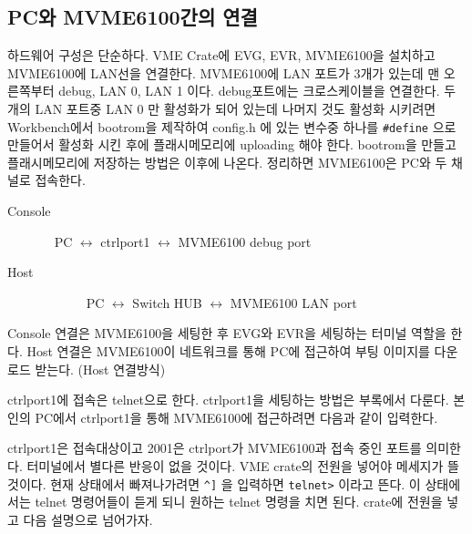 \documentclass[11pt,a4paper]{article}
\begin{document}
\subsection{PC와 MVME6100간의 연결}
하드웨어 구성은 단순하다. VME Crate에 EVG, EVR, MVME6100을 설치하고 MVME6100에 LAN선을 연결한다.
MVME6100에 LAN 포트가 3개가 있는데 맨 오른쪽부터 debug, LAN 0, LAN 1 이다. debug포트에는 크로스케이블을 연결한다.
두개의 LAN 포트중 LAN 0 만 활성화가 되어 있는데 나머지 것도 활성화 시키려면 Workbench에서 bootrom을 제작하여
config.h 에 있는 변수중 하나를 \verb|#define| 으로 만들어서 활성화 시킨 후에 플래시메모리에 uploading 해야 한다.
bootrom을 만들고 플래시메모리에 저장하는 방법은 이후에 나온다.
정리하면 MVME6100은 PC와 두 채널로 접속한다.

\begin{framed}
\begin{description}
\item[Console] ~ PC $\leftrightarrow$ ctrlport1 $\leftrightarrow$ MVME6100 debug port 
\item[Host]   ~~~~~~ PC $\leftrightarrow$ Switch HUB $\leftrightarrow$ MVME6100 LAN port
\end{description}
\end{framed}

Console 연결은 MVME6100을 세팅한 후 EVG와 EVR을 세팅하는 터미널 역할을 한다.
Host 연결은 MVME6100이 네트워크를 통해 PC에 접근하여 부팅 이미지를 다운로드 받는다. (Host 연결방식)

ctrlport1에 접속은 telnet으로 한다. ctrlport1을 세팅하는 방법은 부록에서 다룬다.
본인의 PC에서 ctrlport1을 통해 MVME6100에 접근하려면 다음과 같이 입력한다.

\begin{framed}
\begin{alltt}
ctrluser@ctrlport0:~$ telnet ctrlport1 2001
Trying 10.1.5.161...
Connected to ctrlport1.risp.net.
Escape character is '^]'.
\end{alltt}
\end{framed}

ctrlport1은 접속대상이고 2001은 ctrlport가 MVME6100과 접속 중인 포트를 의미한다.
터미널에서 별다른 반응이 없을 것이다. VME crate의 전원을 넣어야 메세지가 뜰 것이다.
현재 상태에서 빠져나가려면 \verb|^]| 을 입력하면 \verb|telnet>| 이라고 뜬다. 이 상태에서는 
telnet 명령어들이 듣게 되니 원하는 telnet 명령을 치면 된다.
crate에 전원을 넣고 다음 설명으로 넘어가자.
 
\end{document}
